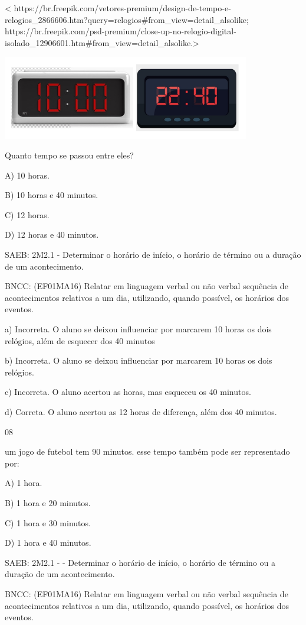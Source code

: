 \begin{itemize}
\begin{itemize}
\textless{}
https://br.freepik.com/vetores-premium/design-de-tempo-e-relogios\_2866606.htm?query=relogios\#from\_view=detail\_alsolike;
https://br.freepik.com/psd-premium/close-up-no-relogio-digital-isolado\_12906601.htm\#from\_view=detail\_alsolike.\textgreater{}

\includegraphics[width=4.26398in,height=1.43904in]{media/image156.png}

Quanto tempo se passou entre eles?

A) 10 horas.

B) 10 horas e 40 minutos.

C) 12 horas.

D) 12 horas e 40 minutos.

SAEB: 2M2.1 - Determinar o horário de início, o horário de término ou a
duração de um acontecimento.

BNCC: (EF01MA16) Relatar em linguagem verbal ou não verbal sequência de
acontecimentos relativos a um dia, utilizando, quando possível, os
horários dos eventos.

a) Incorreta. O aluno se deixou influenciar por marcarem 10 horas os
dois relógios, além de esquecer dos 40 minutos

b) Incorreta. O aluno se deixou influenciar por marcarem 10 horas os
dois relógios.

c) Incorreta. O aluno acertou as horas, mas esqueceu os 40 minutos.

d) Correta. O aluno acertou as 12 horas de diferença, além dos 40
minutos.

\num{08}

um jogo de futebol tem 90 minutos. esse tempo também pode ser
representado por:

A) 1 hora.

B) 1 hora e 20 minutos.

C) 1 hora e 30 minutos.

D) 1 hora e 40 minutos.

SAEB: 2M2.1 - - Determinar o horário de início, o horário de término ou
a duração de um acontecimento.

BNCC: (EF01MA16) Relatar em linguagem verbal ou não verbal sequência de
acontecimentos relativos a um dia, utilizando, quando possível, os
horários dos eventos.


\end{itemize}
\end{itemize}
